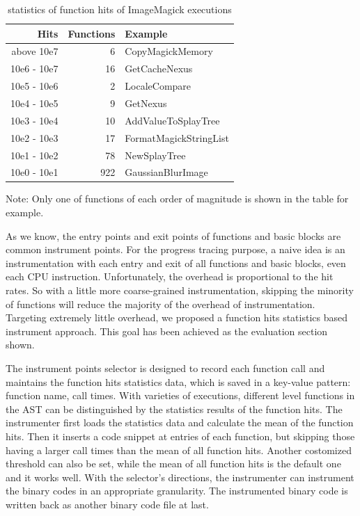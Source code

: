 \begin{table}[h]
\caption{statistics of function hits of ImageMagick executions}
\label{table:inst-stats}
\begin{center}
\begin{tabular}{r|r|l}
\hline
Hits & Functions & Example \\
\hline
above  10e7 & 6 & CopyMagickMemory \\
10e6 - 10e7 & 16 & GetCacheNexus \\
10e5 - 10e6 & 2 & LocaleCompare \\
10e4 - 10e5 & 9 & GetNexus \\
10e3 - 10e4 & 10 & AddValueToSplayTree \\
10e2 - 10e3 & 17 & FormatMagickStringList \\
10e1 - 10e2 & 78 & NewSplayTree \\
10e0 - 10e1 & 922 & GaussianBlurImage \\
\hline
\end{tabular}
\end{center}
Note: Only one of functions of each order of magnitude is shown in the table for example.
\end{table}

As we know, the entry points and exit points of functions and basic blocks are common instrument points. For the progress tracing purpose, a naive idea is an instrumentation with each entry and exit of all functions and basic blocks, even each CPU instruction. Unfortunately, the overhead is proportional to the hit rates. So with a little more coarse-grained instrumentation, skipping the minority of functions will reduce the majority of the overhead of instrumentation. Targeting extremely little overhead, we proposed a function hits statistics based instrument approach. This goal has been achieved as the evaluation section shown.

The instrument points selector is designed to record each function call and maintains the function hits statistics data, which is saved in a key-value pattern: function name, call times. With varieties of executions, different level functions in the AST can be distinguished by the statistics results of the function hits. The instrumenter first loads the statistics data and calculate the mean of the function hits. Then it inserts a code snippet at entries of each function, but skipping those having a larger call times than the mean of all function hits. Another costomized threshold can also be set, while the mean of all function hits is the default one and it works well. With the selector's directions, the instrumenter can instrument the binary codes in an appropriate granularity. The instrumented binary code is written back as another binary code file at last.

